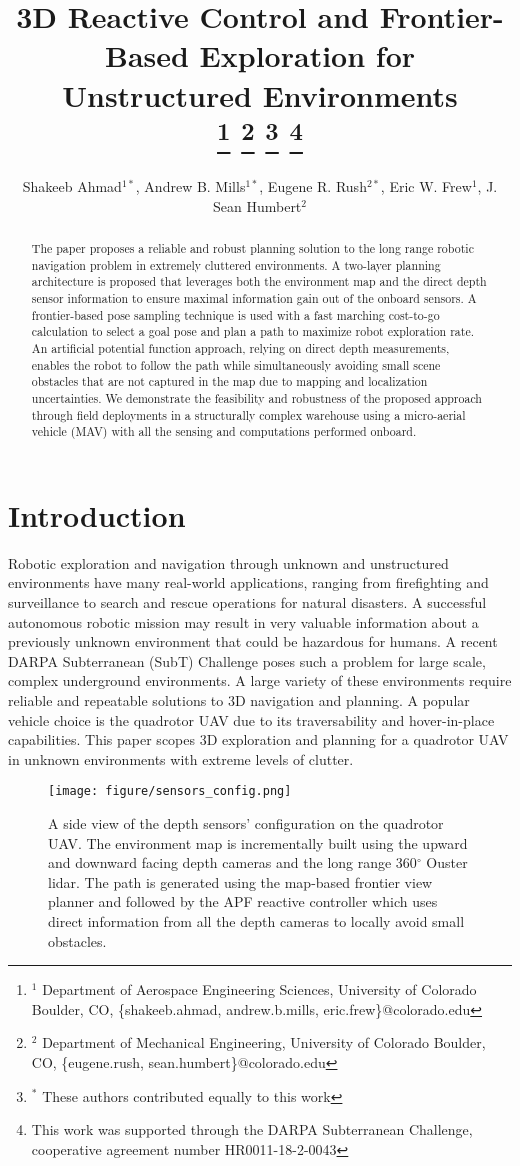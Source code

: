 \documentclass[letterpaper, 10 pt, conference]{ieeeconf}  %
\title{\LARGE \bf 3D Reactive Control and Frontier-Based Exploration for Unstructured Environments \\
\thanks{$^{1}$ Department of Aerospace Engineering Sciences, University of Colorado Boulder, CO, \{shakeeb.ahmad, andrew.b.mills, eric.frew\}@colorado.edu}
\thanks{$^{2}$ Department of Mechanical Engineering, University of Colorado Boulder, CO, \{eugene.rush, sean.humbert\}@colorado.edu}
\thanks{$^{*}$ These authors contributed equally to this work}
\thanks{This work was supported through the DARPA Subterranean Challenge, cooperative agreement number HR0011-18-2-0043}}
\author{Shakeeb Ahmad$^{1*}$, Andrew B. Mills$^{1*}$, Eugene R. Rush$^{2*}$, Eric W. Frew$^{1}$, J. Sean Humbert$^{2}$}
\begin{document}
\maketitle
\thispagestyle{empty}
\pagestyle{empty}

\begin{abstract}
The paper proposes a reliable and robust planning solution to the long range robotic navigation problem in extremely cluttered environments. A two-layer planning architecture is proposed that leverages both the environment map and the direct depth sensor information to ensure maximal information gain out of the onboard sensors. A frontier-based pose sampling technique is used with a fast marching cost-to-go calculation to select a goal pose and plan a path to maximize robot exploration rate. An artificial potential function approach, relying on direct depth measurements, enables the robot to follow the path while simultaneously avoiding small scene obstacles that are not captured in the map due to mapping and localization uncertainties. We demonstrate the feasibility and robustness of the proposed approach through field deployments in a structurally complex warehouse using a micro-aerial vehicle (MAV) with all the sensing and computations performed onboard.
\end{abstract}

\section{Introduction}
Robotic exploration and navigation through unknown and unstructured environments have many real-world applications, ranging from firefighting and surveillance to search and rescue operations for natural disasters. A successful autonomous robotic mission may result in very valuable information about a previously unknown environment that could be hazardous for humans. A recent DARPA Subterranean (SubT) Challenge \cite{subt} poses such a problem for large scale, complex underground environments. A large variety of these environments require reliable and repeatable solutions to 3D navigation and planning. A popular vehicle choice is the quadrotor UAV due to its traversability and hover-in-place capabilities. This paper scopes 3D exploration and planning for a quadrotor UAV in unknown environments with extreme levels of clutter. \par

\begin{figure}
    \centering
    \texttt{[image: figure/sensors\_config.png]}
    \caption{A side view of the depth sensors' configuration on the quadrotor UAV. The environment map is incrementally built using the upward and downward facing depth cameras and the long range 360$^{\circ}$ Ouster lidar. The path is generated using the map-based frontier view planner and followed by the APF reactive controller which uses direct information from all the depth cameras to locally avoid small obstacles.}
    \label{fig:sensor_config}
\end{figure}
\end{document}
